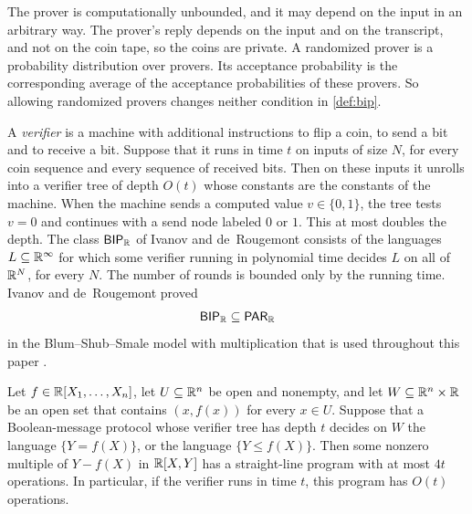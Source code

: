 The prover is computationally unbounded, and it may depend on the input in an arbitrary way.
The prover's reply depends on the input and on the transcript, and not on the coin tape, so the coins are private.
A randomized prover is a probability distribution over provers.
Its acceptance probability is the corresponding average of the acceptance probabilities of these provers.
So allowing randomized provers changes neither condition in \cref{def:bip}.

A \emph{verifier} is a machine with additional instructions to flip a coin, to send a bit and to receive a bit.
Suppose that it runs in time $t$ on inputs of size $N$, for every coin sequence and every sequence of received bits.
Then on these inputs it unrolls into a verifier tree of depth $O(t)$ whose constants are the constants of the machine.
When the machine sends a computed value $v\in\{0,1\}$, the tree tests $v=0$ and continues with a send node labeled $0$ or $1$.
This at most doubles the depth.
The class $\textsf{\upshape BIP}_{\mathbb{R}}$ of Ivanov and de~Rougemont \cite{IdR99} consists of the languages $L\subseteq\mathbb{R}^\infty$ for which some verifier running in polynomial time decides $L$ on all of $\mathbb{R}^N$, for every $N$.
The number of rounds is bounded only by the running time.
Ivanov and de~Rougemont proved
\[
\textsf{\upshape BIP}_{\mathbb{R}}\subseteq\textsf{\upshape PAR}_{\mathbb{R}}
\]
in the Blum--Shub--Smale model with multiplication that is used throughout this paper \cite{IdR99}.

\begin{lemma}\label{lem:boolean}
Let $f\in\mathbb{R}[X_1,\dots,X_n]$, let $U\subseteq\mathbb{R}^n$ be open and nonempty, and let $W\subseteq\mathbb{R}^n\times\mathbb{R}$ be an open set that contains $(x,f(x))$ for every $x\in U$.
Suppose that a Boolean-message protocol whose verifier tree has depth $t$ decides on $W$ the language $\{Y=f(X)\}$, or the language $\{Y\le f(X)\}$.
Then some nonzero multiple of $Y-f(X)$ in $\mathbb{R}[X,Y]$ has a straight-line program with at most $4t$ operations.
In particular, if the verifier runs in time $t$, this program has $O(t)$ operations.
\end{lemma}

